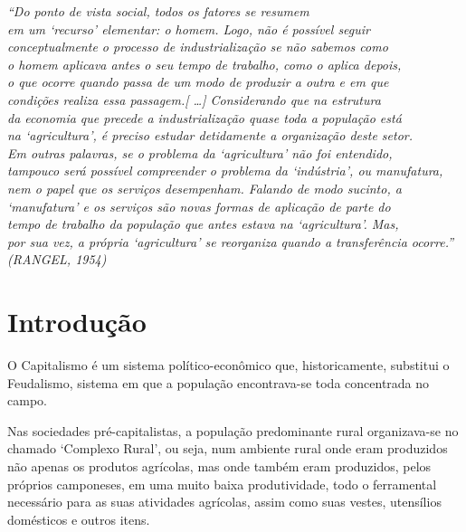 \documentclass[
	12pt,				%
	oneside,			%
	a4paper,			%
	chapter=TITLE,		%
	section=TITLE,		%
	english,			%
	brazil				%
	]{abntex2}
\begin{document}
\begin{refsection}
\begin{epigrafe}
    \vspace*{\fill}
    \begin{flushright}
        \textit{``Do ponto de vista social, todos os fatores se resumem\\ 
        em um `recurso' elementar: o homem. Logo, não é possível seguir\\ 
        conceptualmente o processo de industrialização se não sabemos como\\ 
        o homem aplicava antes o seu tempo de trabalho, como o aplica depois,\\ 
        o que ocorre quando passa de um modo de produzir a outra e em que\\ 
        condições realiza essa passagem.[ \ldots ] Considerando que na estrutura\\ 
        da economia que precede a industrialização quase toda a população está\\ 
        na `agricultura', é preciso estudar detidamente a organização deste setor.\\ 
        Em outras palavras, se o problema da `agricultura' não foi entendido,\\ 
        tampouco será possível compreender o problema da `indústria', ou manufatura,\\ 
        nem o papel que os serviços desempenham. Falando de modo sucinto, a \\
        `manufatura' e os serviços são novas formas de aplicação de parte do\\ 
        tempo de trabalho da população que antes estava na `agricultura'. Mas,\\
        por sua vez, a própria `agricultura' se reorganiza quando a transferência ocorre.''\\
        (RANGEL, 1954)}
    \end{flushright}
\end{epigrafe}
\hypertarget{introduuxe7uxe3o}{%
\section{Introdução}\label{introduuxe7uxe3o}}

O Capitalismo é um sistema político-econômico que, historicamente, substitui o
Feudalismo, sistema em que a população encontrava-se toda concentrada no campo.

Nas sociedades pré-capitalistas, a população predominante rural organizava-se no
chamado `Complexo Rural', ou seja, num ambiente rural onde eram produzidos não
apenas os produtos agrícolas, mas onde também eram produzidos, pelos próprios
camponeses, em uma muito baixa produtividade, todo o ferramental necessário para
as suas atividades agrícolas, assim como suas vestes, utensílios domésticos e
outros itens.


\end{refsection}
\end{document}
